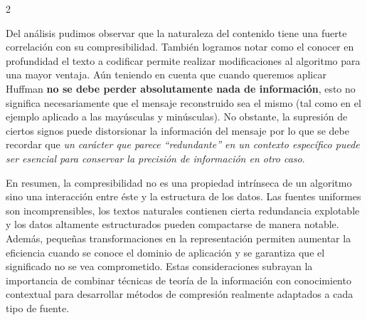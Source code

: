 \documentclass[a4paper, 10pt]{article}
\begin{document}
    \begin{multicols}{2}

    Del análisis pudimos observar que la naturaleza del contenido tiene una fuerte correlación con su compresibilidad. También logramos notar como el conocer en profundidad el texto a codificar permite realizar modificaciones al algoritmo para una mayor ventaja. Aún teniendo en cuenta que cuando queremos aplicar Huffman \textbf{no se debe perder absolutamente nada de información}, esto no significa necesariamente que el mensaje reconstruido sea el mismo (tal como en el ejemplo aplicado a las mayúsculas y minúsculas). No obstante, la supresión de ciertos signos puede distorsionar la información del mensaje por lo que se debe recordar que \textit{un carácter que parece ``redundante'' en un contexto específico puede ser esencial para conservar la precisión de información en otro caso}.
  
    En resumen, la compresibilidad no es una propiedad intrínseca de un algoritmo sino una interacción entre éste y la estructura de los datos. Las fuentes uniformes son incomprensibles, los textos naturales contienen cierta redundancia explotable y los datos altamente estructurados pueden compactarse de manera notable. Además, pequeñas transformaciones en la representación permiten aumentar la eficiencia cuando se conoce el dominio de aplicación y se garantiza que el significado no se vea comprometido. Estas consideraciones subrayan la importancia de combinar técnicas de teoría de la información con conocimiento contextual para desarrollar métodos de compresión realmente adaptados a cada tipo de fuente.

    \end{multicols}
\end{document}
